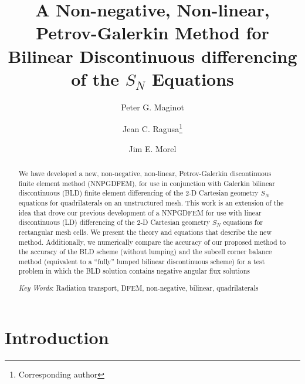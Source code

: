 \documentclass{mc2015}
\begin{document}
\title{A Non-negative, Non-linear, Petrov-Galerkin Method for Bilinear Discontinuous differencing of the $S_N$ Equations}

\author{Peter G. Maginot}
\author{Jean C. Ragusa\footnote{Corresponding author} }
\author{Jim E. Morel}

\maketitle

\begin{abstract}
We have developed a new, non-negative, non-linear, Petrov-Galerkin discontinuous finite element method (NNPGDFEM), for use in conjunction with Galerkin bilinear discontinuous  
(BLD) finite element differencing of the 2-D Cartesian geometry $S_N$ equations for quadrilaterals on an unstructured mesh.  
This work is an extension of the idea that drove our previous development of a NNPGDFEM for use with linear discontinuous (LD) differencing of the 2-D Cartesian geometry $S_N$ equations for rectangular mesh cells.
We present the theory and equations that describe the new method.  
Additionally, we numerically compare the accuracy of our proposed method to the accuracy of the BLD scheme (without lumping) and the subcell corner balance method (equivalent to a ``fully'' lumped bilinear discontinuous scheme) for a test problem in which the BLD solution contains negative angular flux solutions

\emph{Key Words}: Radiation transport, DFEM, non-negative, bilinear, quadrilaterals
\end{abstract}


\section{Introduction}

%
%
%
\end{document}
